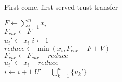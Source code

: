 \begin{algorithm}[H]
   \label{fcfs}
   \caption{First-come, first-served trust transfer}
   $F \gets \sum\limits_{i=1}^{n}x_i$ \label{fcfsfinit}\\
   $F_{cur} \gets F$ \label{fcfsfcurinit}\\
      {$u_i' \gets x_i$} \label{fcfscapinit}
   $i \gets 1$ \label{fcfsiinit}\\
      {$reduce \gets \min{(x_i, F_{cur} - F + V)}$ \\
       $F_{cur} \gets F_{cur} - reduce$ \\
       $u_i' \gets x_i - reduce$ \label{capmod}\\
       $i \gets i + 1$ \label{fcfsiinc}}
   \Return $U' = \bigcup\limits_{k=1}^{n}\{u_k'\}$ \label{fcfsreturn}
\end{algorithm}
